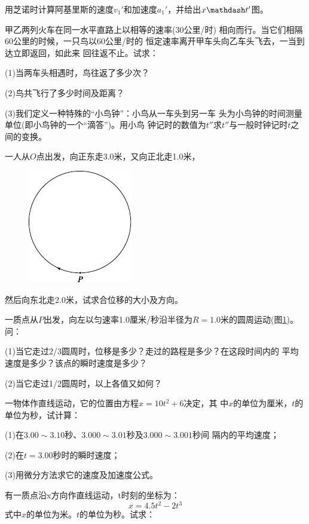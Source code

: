 \begin{exercises}

\exercise 用芝诺时计算阿基里斯的速度$v_1'$和加速度$a_1'$，并给出$x \mathdash t'$图。

\exercise 甲乙两列火车在同一水平直路上以相等的速率(30公里/时)
相向而行。当它们相隔60公里的时候，一只鸟以60公里/时的
恒定速率离开甲车头向乙车头飞去，一当到达立即返回，如此来
回往返不止。试求：

(1)当两车头相遇时，鸟往返了多少次？

(2)鸟共飞行了多少时间及距离？

(3)我们定义一种特殊的“小鸟钟”：小鸟从一车头到另一车
头为小鸟钟的时间测量单位(即小鸟钟的一个“滴答”)。用小鸟
钟记时的数值为$t''$求$t''$与一般时钟记时$t$之间的变换。

\exercise 一人从$O$点出发，向正东走3.0米，又向正北走1.0米，
\begin{figure}
  \begin{center}
    \includegraphics{figure/fig01.28}
    \caption{}
    \label{fig:01.28}
  \end{center}
\end{figure}
然后向东北走2.0米，试求合位移的大小及方向。

\exercise 一质点从$ P $出发，向左以匀速率1.0厘米/秒沿半径为$R=1.0$米的圆周运动(图\ref{fig:01.28})。问：

(1)当它走过2/3圆周时，位移是多少？走过的路程是多少？在这段时间内的
平均速度是多少？该点的瞬时速度是多少？

\clearpage
(2)当它走过1/2圆周时，以上各值又如何？

\exercise 一物体作直线运动，它的位置由方程$x=10t^2+6$决定，其
中$x$的单位为厘米，$t$的单位为秒，试计算：

(1)在$ 3.00\sim 3.10 $秒、$ 3.000\sim 3.01 $秒及$ 3.000\sim 3.001 $秒间
隔内的平均速度；

(2)在$t=3.00$秒时的瞬时速度；

(3)用微分方法求它的速度及加速度公式。

\exercise 有一质点沿x方向作直线运动，t时刻的坐标为：
\begin{equation*}
    x=4.5t^2-2t^3
\end{equation*}
式中$x$的单位为米。$t$的单位为秒。试求：


\end{exercises}
